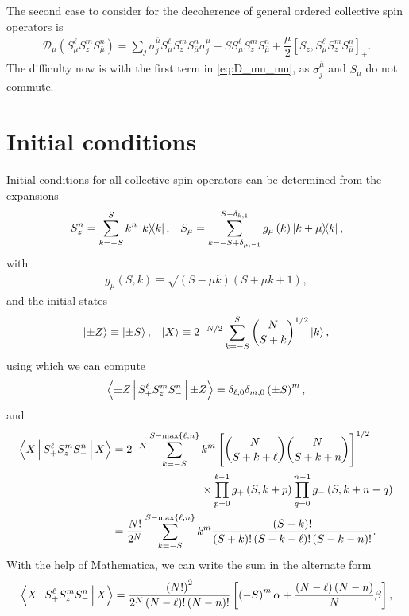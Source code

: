\documentclass[aps,notitlepage,nofootinbib,11pt]{revtex4-1}
\newcommand{\f}[2]{\dfrac{#1}{#2}} %
\newcommand{\p}[1]{\left(#1\right)} %
\renewcommand{\sp}[1]{\left[#1\right]} %
\renewcommand{\set}[1]{\left\{#1\right\}} %
\newcommand{\bk}{\Braket} %
\newcommand{\D}{\mathcal{D}}
\newcommand{\bmu}{{\bar\mu}}
\newcommand{\1}{\mathds{1}}
\begin{document}
The second case to consider for the decoherence of general ordered
collective spin operators is
\begin{align}
  \D_\mu\p{S_\mu^\ell S_z^m S_\bmu^n}
  = \sum_j\sigma_j^\bmu S_\mu^\ell S_z^m S_\bmu^n \sigma_j^\mu
  - S S_\mu^\ell S_z^m S_\bmu^n
  + \f{\mu}{2} \sp{S_z, S_\mu^\ell S_z^m S_\bmu^n}_+.
  \label{eq:D_mu_mu}
\end{align}
The difficulty now is with the first term in \eqref{eq:D_mu_mu}, as
$\sigma_j^\bmu$ and $S_\mu$ do not commute.


\section{Initial conditions}
\label{sec:initial_conditions}

Initial conditions for all collective spin operators can be determined
from the expansions
\begin{align}
  S_z^n = \sum_{k=-S}^S k^n \op{k},
  &&
  S_\mu
  = \sum_{k=-S+\delta_{\mu,-1}}^{S-\delta_{k,1}}
  g_\mu\p{k} \op{k+\mu}{k},
\end{align}
with
\begin{align}
  g_\mu\p{S,k} \equiv \sqrt{\p{S-\mu k}\p{S+\mu k+1}},
\end{align}
and the initial states
\begin{align}
  \ket{\pm Z} \equiv \ket{\pm S},
  &&
  \ket{X} \equiv 2^{-N/2} \sum_{k=-S}^S { N \choose S+k }^{1/2} \ket{k},
\end{align}
using which we can compute
\begin{align}
  \bk{\pm Z|S_+^\ell S_z^m S_-^n|\pm Z}
  = \delta_{\ell,0} \delta_{m,0} \p{\pm S}^m,
\end{align}
and
\begin{align}
  \bk{X|S_+^\ell S_z^m S_-^n|X}
  &=  2^{-N} \sum_{k=-S}^{S-\max\set{\ell,n}} k^m
  \sp{{ N \choose S+k+\ell } { N \choose S+k+n }}^{1/2} \tag*{} \\
  &\qquad\qquad\qquad\qquad
  \times \prod_{p=0}^{\ell-1} g_+\p{S,k+p}
  \prod_{q=0}^{n-1} g_-\p{S,k+n-q} \\
  &= \f{N!}{2^N} \sum_{k=-S}^{S-\max\set{\ell,n}} k^m
  \f{\p{S-k}!}{\p{S+k}!\p{S-k-\ell}!\p{S-k-n}!}.
\end{align}
With the help of Mathematica, we can write the sum in the alternate
form
\begin{align}
  \bk{X|S_+^\ell S_z^m S_-^n|X}
  = \f{\p{N!}^2}{2^N\p{N-\ell}!\p{N-n}!}
  \sp{\p{-S}^m \alpha + \f{\p{N-\ell}\p{N-n}}{N} \beta},
\end{align}
\end{document}
